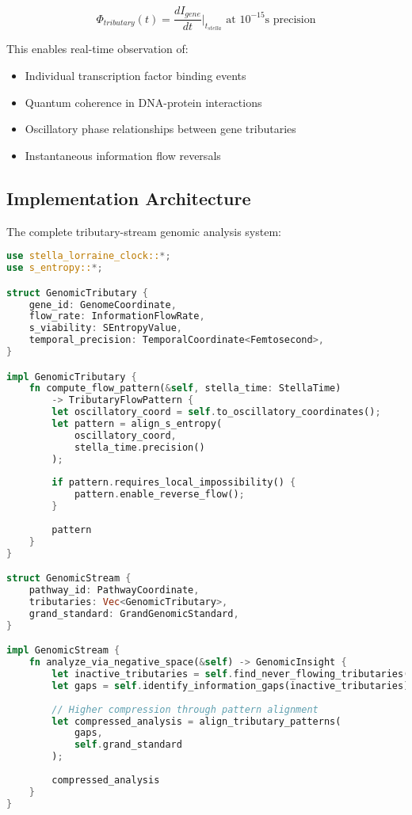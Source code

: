 \documentclass[12pt,a4paper]{article}
\begin{document}
\begin{equation}
\Phi_{tributary}(t) = \frac{dI_{gene}}{dt}\bigg|_{t_{stella}} \text{ at } 10^{-15}\text{s precision}
\end{equation}

This enables real-time observation of:
\begin{itemize}
\item Individual transcription factor binding events
\item Quantum coherence in DNA-protein interactions  
\item Oscillatory phase relationships between gene tributaries
\item Instantaneous information flow reversals
\end{itemize}

\subsection{Implementation Architecture}

The complete tributary-stream genomic analysis system:

\begin{lstlisting}[language=Rust, caption=Tributary-Stream Genomic Engine]
use stella_lorraine_clock::*;
use s_entropy::*;

struct GenomicTributary {
    gene_id: GenomeCoordinate,
    flow_rate: InformationFlowRate,
    s_viability: SEntropyValue,
    temporal_precision: TemporalCoordinate<Femtosecond>,
}

impl GenomicTributary {
    fn compute_flow_pattern(&self, stella_time: StellaTime) 
        -> TributaryFlowPattern {
        let oscillatory_coord = self.to_oscillatory_coordinates();
        let pattern = align_s_entropy(
            oscillatory_coord,
            stella_time.precision()
        );
        
        if pattern.requires_local_impossibility() {
            pattern.enable_reverse_flow();
        }
        
        pattern
    }
}

struct GenomicStream {
    pathway_id: PathwayCoordinate,
    tributaries: Vec<GenomicTributary>,
    grand_standard: GrandGenomicStandard,
}

impl GenomicStream {
    fn analyze_via_negative_space(&self) -> GenomicInsight {
        let inactive_tributaries = self.find_never_flowing_tributaries();
        let gaps = self.identify_information_gaps(inactive_tributaries);
        
        // Higher compression through pattern alignment
        let compressed_analysis = align_tributary_patterns(
            gaps,
            self.grand_standard
        );
        
        compressed_analysis
    }
}
\end{lstlisting}
\end{document}
